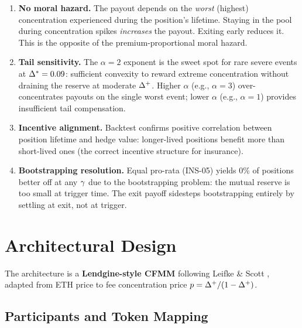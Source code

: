 \begin{enumerate}
  \item \textbf{No moral hazard.} The payout depends on the \emph{worst} (highest)
    concentration experienced during the position's lifetime. Staying in the pool
    during concentration spikes \emph{increases} the payout. Exiting early reduces it.
    This is the opposite of the premium-proportional moral hazard.

  \item \textbf{Tail sensitivity.} The $\alpha = 2$ exponent is the sweet spot for
    rare severe events at $\Delta^{*} = 0.09$: sufficient convexity to reward
    extreme concentration without draining the reserve at moderate $\Delta^{+}$.
    Higher $\alpha$ (e.g., $\alpha = 3$) over-concentrates payouts on the single worst event;
    lower $\alpha$ (e.g., $\alpha = 1$) provides insufficient tail compensation.

  \item \textbf{Incentive alignment.} Backtest confirms positive correlation between
    position lifetime and hedge value: longer-lived positions benefit more than
    short-lived ones (the correct incentive structure for insurance).

  \item \textbf{Bootstrapping resolution.} Equal pro-rata (INS-05) yields 0\% of
    positions better off at any $\gamma$ due to the bootstrapping problem:
    the mutual reserve is too small at trigger time. The exit payoff sidesteps
    bootstrapping entirely by settling at exit, not at trigger.
\end{enumerate}

\section{Architectural Design}\label{sec:architecture}

The architecture is a \textbf{Lendgine-style CFMM} following
Leifke \& Scott \cite{leifke2024powermaker}, adapted from ETH price to
fee concentration price $p = \Delta^{+}/(1-\Delta^{+})$.

\subsection{Participants and Token Mapping}

